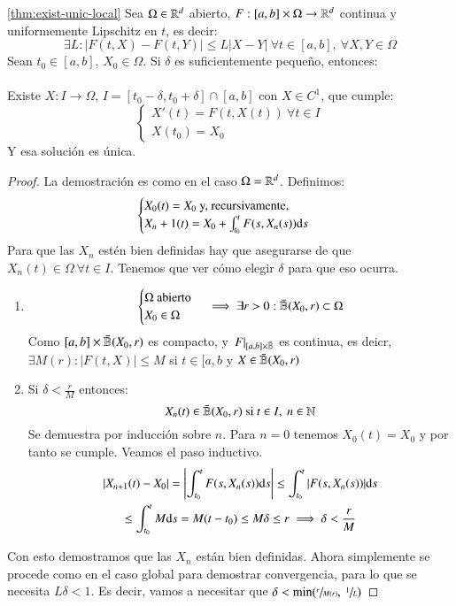 \begin{thm}\ref{thm:exist-unic-local}
    Sea $\Omega \in \mathbb{R}^d$ abierto, $F:[a, b] \times \Omega \to \mathbb{R}^d$ continua y uniformemente Lipschitz en $t$, es decir:
    $$
        \exists L : |F(t, X) - F(t, Y)| \leq L |X - Y| \ \forall t \in [a, b],\ \forall X, Y \in \Omega
    $$
    Sean $t_0 \in [a, b]$, $X_0 \in \Omega$. Si $\delta$ es suficientemente pequeño, entonces:\\\\
    Existe $X:I \to \Omega$, $I = [t_0 - \delta, t_0 + \delta] \cap [a, b]$ con $X \in C^1$, que cumple:
    $$
    \begin{cases}
        X'(t) = F(t, X(t))\ \forall t \in I\\
        X(t_0) = X_0
    \end{cases}
    $$
    Y esa solución es única.
\end{thm}
\begin{proof}
    La demostración es como en el caso $\Omega = \mathbb{R}^d$. Definimos:
    $$
        \begin{cases}
            X_0(t) = X_0 \text{ y, recursivamente, }\\
            X_n+1(t) = X_0 + \int_{t_0}^t F(s, X_n(s)) \mathrm{d} s
        \end{cases}
    $$
    Para que las $X_n$ estén bien definidas hay que asegurarse de que $X_n(t) \in \Omega\ \forall t \in I$. Tenemos que ver cómo elegir $\delta$ para que eso ocurra.
    \begin{enumerate}
        \item
        $$
            \begin{cases}
                \Omega \text{ abierto}\\
                X_0 \in \Omega
            \end{cases} \implies \exists r > 0 : \bar{\mathbb{B}}(X_0, r) \subset \Omega
        $$
        Como $[a, b] \times \bar{\mathbb{B}}(X_0, r)$ es compacto, y $\left. F \right|_{[a, b]\times\bar{\mathbb{B}}}$ es continua, es deicr, $\exists M(r) : |F(t, X)| \leq M$ si $t \in [a, b$ y $X \in  \bar{\mathbb{B}}(X_0, r)$
        \item Si $\delta < \frac{r}{M}$ entonces:
        $$
            X_n(t) \in \bar{\mathbb{B}}(X_0, r) \text{ si } t\in I,\ n \in \mathbb{N}
        $$
        Se demuestra por inducción sobre $n$. Para $n=0$ tenemos $X_0(t) = X_0$ y por tanto se cumple. Veamos el paso inductivo.\\
        \begin{gather*}
            |X_{n+1}(t) - X_0 | = \left| \int_{t_0}^t F(s, X_n(s)) \mathrm{d} s \right| \leq \int_{t_0}^t |F(s, X_n(s))| \mathrm{d} s\\ \leq \int_{t_0}^t M\mathrm{d} s = M(t - t_0) \leq M \delta \leq r \implies \delta < \frac{r}{M}
        \end{gather*}
    \end{enumerate}
    Con esto demostramos que las $X_n$ están bien definidas. Ahora simplemente se procede como en el caso global para demostrar convergencia, para lo que se necesita $L\delta < 1$. Es decir, vamos a necesitar que $\delta < \min (\sfrac{r}{M(r)},\ \sfrac{1}{L})$
\end{proof}
